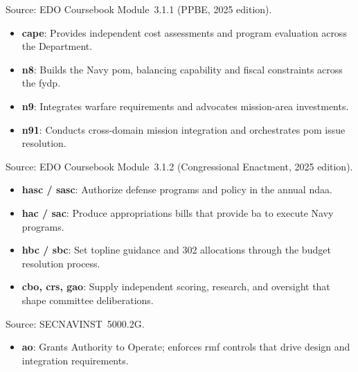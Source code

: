 \documentclass[../main.tex]{subfiles}
\begin{document}
\begin{description}[style=nextline, labelsep=0.5em, font=\bfseries]
	\item[\textbf{PPBE resource sponsors.}]
	Source: EDO Coursebook Module~3.1.1 (PPBE, 2025 edition).
      \begin{itemize}
        \item \textbf{\ac{cape}}: Provides independent cost assessments and program evaluation across the Department.
        \item \textbf{\ac{n8}}: Builds the Navy \ac{pom}, balancing capability and fiscal constraints across the \ac{fydp}.
        \item \textbf{\ac{n9}}: Integrates warfare requirements and advocates mission-area investments.
        \item \textbf{\ac{n91}}: Conducts cross-domain mission integration and orchestrates \ac{pom} issue resolution.
      \end{itemize}

	\item[\textbf{Congressional resource chain.}]
	Source: EDO Coursebook Module~3.1.2 (Congressional Enactment, 2025 edition).
      \begin{itemize}
        \item \textbf{\ac{hasc} / \ac{sasc}}: Authorize defense programs and policy in the annual \ac{ndaa}.
        \item \textbf{\ac{hac} / \ac{sac}}: Produce appropriations bills that provide \ac{ba} to execute Navy programs.
        \item \textbf{\ac{hbc} / \ac{sbc}}: Set topline guidance and 302 allocations through the budget resolution process.
        \item \textbf{\ac{cbo}, \ac{crs}, \ac{gao}}: Supply independent scoring, research, and oversight that shape committee deliberations.
      \end{itemize}

	\item[\textbf{Cyber/Authorizations (when IT/C2 in scope).}]
	Source: SECNAVINST~5000.2G.
      \begin{itemize}
        \item \textbf{\ac{ao}}: Grants Authority to Operate; enforces \ac{rmf} controls that drive design and integration requirements.
      \end{itemize}
\end{description}
\end{document}
